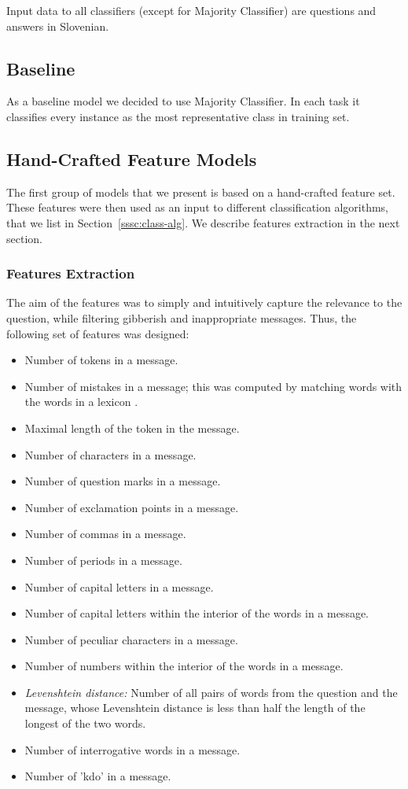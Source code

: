 \documentclass[11pt,a4paper]{article}
\begin{document}
Input data to all classifiers (except for Majority Classifier) are questions and answers in Slovenian.

\subsection{Baseline}
As a baseline model we decided to use Majority Classifier. In each task it classifies every instance as the most representative class in training set.

\subsection{Hand-Crafted Feature Models}
The first group of models that we present is based on a hand-crafted feature set. These features were then used as an input to different classification algorithms, that we list in Section~\ref{sssc:class-alg}. We describe features extraction in the next section.

\subsubsection{Features Extraction}
The aim of the features was to simply and intuitively capture the relevance to the question, while filtering gibberish and inappropriate messages. Thus, the following set of features was designed:

\begin{itemize}
     \item Number of tokens in a message.
     \item Number of mistakes in a message; this was computed by matching words with the words in a lexicon \cite{11356/1230}.
     \item Maximal length of the token in the message.
     \item Number of characters in a message.
     \item Number of question marks in a message.
     \item Number of exclamation points in a message.
     \item Number of commas in a message.
     \item Number of periods in a message.
     \item Number of capital letters in a message.
     \item Number of capital letters within the interior of the words  in a message.
     \item Number of peculiar characters in a message.
     \item Number of numbers within the interior of the words in a message.
     \item \textit{Levenshtein distance:} Number of all pairs of words from the question and the message, whose Levenshtein distance is less than half the length of the longest of the two words.
     \item Number of interrogative words in a message.
     \item Number of 'kdo' in a message.
\end{itemize}
\end{document}
